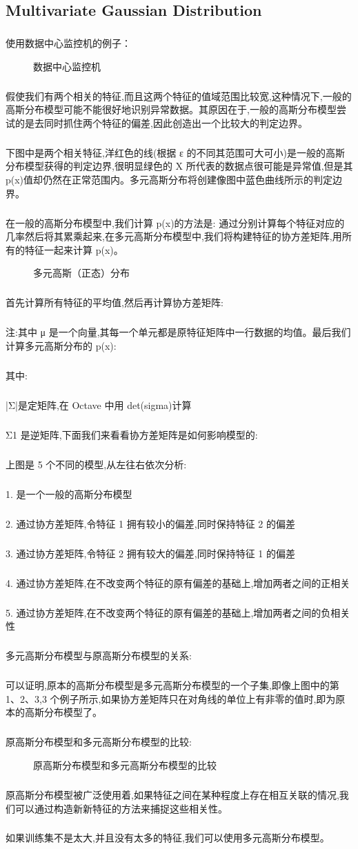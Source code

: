 \documentclass{article}
\begin{document}
\begin{CJK}{UTF8}{gbsn}
\subsection{Multivariate Gaussian Distribution}
\subparagraph{}
使用数据中心监控机的例子：
\begin{figure}[H]
\label{fig:950}
\caption{数据中心监控机}
\end{figure}
\subparagraph{}
假使我们有两个相关的特征,而且这两个特征的值域范围比较宽,这种情况下,一般的高斯分布模型可能不能很好地识别异常数据。其原因在于,一般的高斯分布模型尝试的是去同时抓住两个特征的偏差,因此创造出一个比较大的判定边界。
\subparagraph{}
下图中是两个相关特征,洋红色的线(根据 ε 的不同其范围可大可小)是一般的高斯分布模型获得的判定边界,很明显绿色的 X 所代表的数据点很可能是异常值,但是其 p(x)值却仍然在正常范围内。多元高斯分布将创建像图中蓝色曲线所示的判定边界。
\subparagraph{}
在一般的高斯分布模型中,我们计算 p(x)的方法是: 通过分别计算每个特征对应的几率然后将其累乘起来,在多元高斯分布模型中,我们将构建特征的协方差矩阵,用所有的特征一起来计算 p(x)。
\begin{figure}[H]
\label{fig:952}
\caption{多元高斯（正态）分布}
\end{figure}
\subparagraph{}
首先计算所有特征的平均值,然后再计算协方差矩阵:
\begin{figure}[H]
\label{fig:953}
\end{figure}
\subparagraph{}
注:其中 μ 是一个向量,其每一个单元都是原特征矩阵中一行数据的均值。最后我们计算多元高斯分布的 p(x):
\begin{figure}[H]
\label{fig:954}
\end{figure}
\subparagraph{}
其中:
\subparagraph{}
|Σ|是定矩阵,在 Octave 中用 det(sigma)计算
\subparagraph{}
Σ1 是逆矩阵,下面我们来看看协方差矩阵是如何影响模型的:
\subparagraph{}
上图是 5 个不同的模型,从左往右依次分析:\subparagraph{}
1. 是一个一般的高斯分布模型
\subparagraph{}
2. 通过协方差矩阵,令特征 1 拥有较小的偏差,同时保持特征 2 的偏差
\subparagraph{}
3. 通过协方差矩阵,令特征 2 拥有较大的偏差,同时保持特征 1 的偏差
\subparagraph{}
4. 通过协方差矩阵,在不改变两个特征的原有偏差的基础上,增加两者之间的正相关
\subparagraph{}
5. 通过协方差矩阵,在不改变两个特征的原有偏差的基础上,增加两者之间的负相关性
\subparagraph{}
多元高斯分布模型与原高斯分布模型的关系:
\subparagraph{}
可以证明,原本的高斯分布模型是多元高斯分布模型的一个子集,即像上图中的第1、2、3,3 个例子所示,如果协方差矩阵只在对角线的单位上有非零的值时,即为原本的高斯分布模型了。
\subparagraph{}
原高斯分布模型和多元高斯分布模型的比较:
\begin{figure}[H]
\label{fig:946}
\caption{原高斯分布模型和多元高斯分布模型的比较}
\end{figure}
\subparagraph{}
原高斯分布模型被广泛使用着,如果特征之间在某种程度上存在相互关联的情况,我们可以通过构造新新特征的方法来捕捉这些相关性。
\subparagraph{}
如果训练集不是太大,并且没有太多的特征,我们可以使用多元高斯分布模型。

\end{CJK}
\end{document}
